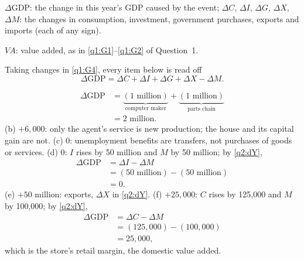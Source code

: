 \begin{sol}
\begin{notacao}
\item $\Delta\text{GDP}$: the change in this year's GDP caused by the event; $\Delta C$, $\Delta I$, $\Delta G$, $\Delta X$, $\Delta M$:
the changes in consumption, investment, government purchases, exports and imports (each of any sign).
\item $VA$: value added, as in \eqref{q1:G1}--\eqref{q1:G2} of Question~1.
\end{notacao}
Taking changes in \eqref{q1:G4}, every item below is read off
\begin{equation}
\Delta\text{GDP}=\Delta C+\Delta I+\Delta G+\Delta X-\Delta M. \label{q2:dY}
\end{equation}


\begin{align*}
\Delta\text{GDP} &= \underbrace{(1\text{ million})}_{\text{computer maker}}+\underbrace{(1\text{ million})}_{\text{parts chain}}\\
&= 2\text{ million}.
\end{align*}
(b) $+6{,}000$: only the agent's service is new production; the house and its capital gain are not.
(c) $0$: unemployment benefits are transfers, not purchases of goods or services.
(d) $0$: $I$ rises by 50 million and $M$ by 50 million; by \eqref{q2:dY},
\begin{align*}
\Delta\text{GDP} &= \Delta I-\Delta M\\
&= (50\text{ million})-(50\text{ million})\\
&= 0 .
\end{align*}
(e) $+50$ million: exports, $\Delta X$ in \eqref{q2:dY}.
(f) $+25{,}000$: $C$ rises by 125{,}000 and $M$ by 100{,}000; by \eqref{q2:dY},
\begin{align*}
\Delta\text{GDP} &= \Delta C-\Delta M\\
&= (125{,}000)-(100{,}000)\\
&= 25{,}000 ,
\end{align*}
which is the store's retail margin, the domestic value added.


\end{sol}
